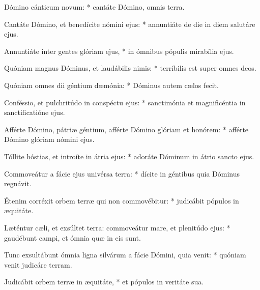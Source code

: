 \begin{psalmus}

     Dómino cánticum novum: * cantáte Dómino, omnis terra.

    Cantáte Dómino, et benedícite nómini ejus: * annuntiáte de die in diem salutáre ejus.

    Annuntiáte inter gentes glóriam ejus, * in ómnibus pópulis mirabília ejus.

    Quóniam magnus Dóminus, et laudábilis nimis: * terríbilis est super omnes deos.

    Quóniam omnes dii géntium dæmónia: * Dóminus autem cælos fecit.

    Conféssio, et pulchritúdo in conspéctu ejus: * sanctimónia et magnificéntia in sanctificatióne ejus.

    Afférte Dómino, pátriæ géntium, afférte Dómino glóriam et honórem: * afférte Dómino glóriam nómini ejus.

    Tóllite hóstias, et introíte in átria ejus: * adoráte Dóminum in átrio sancto ejus.

    Commoveátur a fácie ejus univérsa terra: * dícite in géntibus quia Dóminus regnávit.

    Étenim corréxit orbem terræ qui non commovébitur: * judicábit pópulos in æquitáte.

    Læténtur cæli, et exsúltet terra: commoveátur mare, et plenitúdo ejus: * gaudébunt campi, et ómnia quæ in eis sunt.

    Tunc exsultábunt ómnia ligna silvárum a fácie Dómini, quia venit: * quóniam venit judicáre terram.

    Judicábit orbem terræ in æquitáte, * et pópulos in veritáte sua.

\end{psalmus}

